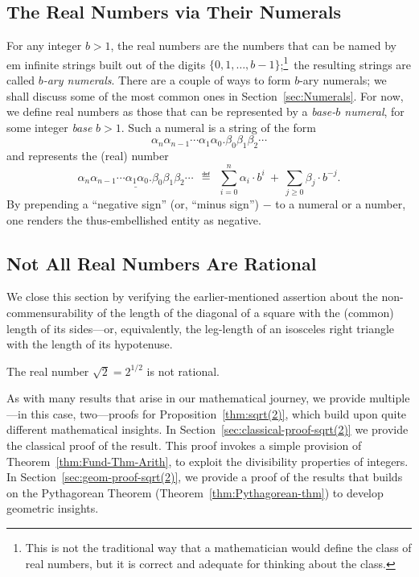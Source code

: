 \subsection{The Real Numbers via Their Numerals}
\label{sec:define-Reals}

For any integer $b > 1$, the real numbers are the numbers that can be
named by {em infinite} strings built out of the digits $\{0, 1,
\ldots, b-1\}$;\footnote{This is not the traditional way that a
  mathematician would define the class of real numbers, but it is
  correct and adequate for thinking about the class.}~the resulting
strings are called {\em $b$-ary numerals}.  There are a couple of ways
to form $b$-ary numerals; we shall discuss some of the most common
ones in Section~\ref{sec:Numerals}.  For now, we define real numbers
as those that can be represented by a {\it base-$b$ numeral},
for some integer {\it base} $b >1$.
Such a numeral is a string of the form
\[
\alpha_n \alpha_{n-1} \cdots \alpha_1 \alpha_0                  
. \beta_0 \beta_1 \beta_2 \cdots
\]
and represents the (real) number
\[
\underline{\alpha_n \alpha_{n-1} \cdots \alpha_1 \alpha_0                  
. \beta_0 \beta_1 \beta_2 \cdots}
\ \ \eqdef \ \
\sum_{i=0}^n \alpha_i \cdot b^i
\ + \ \sum_{j\geq 0} \beta_j \cdot b^{-j}.
\]
By prepending a ``negative sign'' (or, ``minus sign'') $-$ to a
numeral or a number, one renders the thus-embellished entity as
negative.


\subsection{Not All Real Numbers Are Rational}
\label{sec:Real-vs-Rational}

We close this section by verifying the earlier-mentioned assertion
about the non-commensurability of the length of the diagonal of a
square with the (common) length of its sides---or, equivalently, the
leg-length of an isosceles right triangle with the length of its
hypotenuse.


\begin{prop}
\label{thm:sqrt(2)}
The real number $\sqrt{2} = 2^{1/2}$ is not rational.
\end{prop}

As with many results that arise in our mathematical journey, we
provide multiple---in this case, two---proofs for
Proposition~\ref{thm:sqrt(2)}, which build upon quite different
mathematical insights.  In Section~\ref{sec:classical-proof-sqrt(2)}
we provide the classical proof of the result.  This proof invokes a
simple provision of Theorem~\ref{thm:Fund-Thm-Arith}, to exploit the
divisibility properties of integers.  In
Section~\ref{sec:geom-proof-sqrt(2)}, we provide a proof of the
results that builds on the Pythagorean Theorem
(Theorem~\ref{thm:Pythagorean-thm}) to develop geometric insights.

